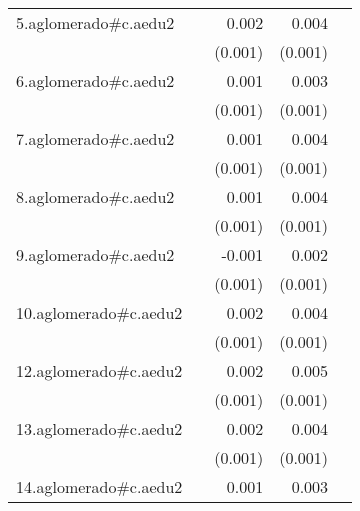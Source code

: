 {\begin{longtable}{l*{4}{D{.}{.}{-1}}}
\addlinespace
5.aglomerado#c.aedu2&                     &       0.002         &       0.004\sym{***}&                     \\
            &                     &     (0.001)         &     (0.001)         &                     \\
\addlinespace
6.aglomerado#c.aedu2&                     &       0.001         &       0.003\sym{***}&                     \\
            &                     &     (0.001)         &     (0.001)         &                     \\
\addlinespace
7.aglomerado#c.aedu2&                     &       0.001         &       0.004\sym{***}&                     \\
            &                     &     (0.001)         &     (0.001)         &                     \\
\addlinespace
8.aglomerado#c.aedu2&                     &       0.001         &       0.004\sym{***}&                     \\
            &                     &     (0.001)         &     (0.001)         &                     \\
\addlinespace
9.aglomerado#c.aedu2&                     &      -0.001         &       0.002         &                     \\
            &                     &     (0.001)         &     (0.001)         &                     \\
\addlinespace
10.aglomerado#c.aedu2&                     &       0.002         &       0.004\sym{***}&                     \\
            &                     &     (0.001)         &     (0.001)         &                     \\
\addlinespace
12.aglomerado#c.aedu2&                     &       0.002\sym{*}  &       0.005\sym{***}&                     \\
            &                     &     (0.001)         &     (0.001)         &                     \\
\addlinespace
13.aglomerado#c.aedu2&                     &       0.002         &       0.004\sym{***}&                     \\
            &                     &     (0.001)         &     (0.001)         &                     \\
\addlinespace
14.aglomerado#c.aedu2&                     &       0.001         &       0.003\sym{***}&                     \\

\end{longtable}}
